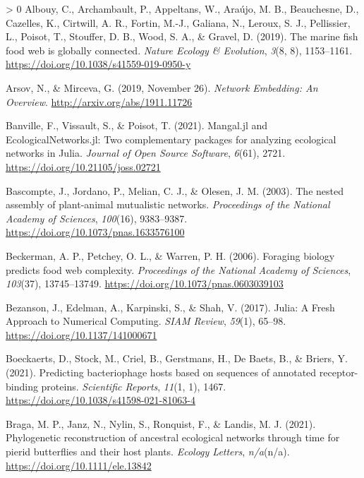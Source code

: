 \documentclass[10pt,oneside]{article}
\newlength{\cslhangindent}
\newenvironment{CSLReferences}[3] %
 {%
  \setlength{\parindent}{0pt}
  \ifodd #1 \everypar{\setlength{\hangindent}{\cslhangindent}}\ignorespaces\fi
  \ifnum #2 > 0
  \setlength{\parskip}{#2\baselineskip}
  \fi
 }%
 {}
\begin{document}
\hypertarget{refs}{}
\begin{CSLReferences}{1}{0}
\leavevmode\hypertarget{ref-Albouy2019MarFis}{}%
Albouy, C., Archambault, P., Appeltans, W., Araújo, M. B., Beauchesne,
D., Cazelles, K., Cirtwill, A. R., Fortin, M.-J., Galiana, N., Leroux,
S. J., Pellissier, L., Poisot, T., Stouffer, D. B., Wood, S. A., \&
Gravel, D. (2019). The marine fish food web is globally connected.
\emph{Nature Ecology \& Evolution}, \emph{3}(8, 8), 1153--1161.
\url{https://doi.org/10.1038/s41559-019-0950-y}

\leavevmode\hypertarget{ref-Arsov2019NetEmb}{}%
Arsov, N., \& Mirceva, G. (2019, November 26). \emph{Network Embedding:
An Overview}. \url{http://arxiv.org/abs/1911.11726}

\leavevmode\hypertarget{ref-Banville2021ManJl}{}%
Banville, F., Vissault, S., \& Poisot, T. (2021). Mangal.jl and
EcologicalNetworks.jl: Two complementary packages for analyzing
ecological networks in Julia. \emph{Journal of Open Source Software},
\emph{6}(61), 2721. \url{https://doi.org/10.21105/joss.02721}

\leavevmode\hypertarget{ref-Bascompte2003NesAss}{}%
Bascompte, J., Jordano, P., Melian, C. J., \& Olesen, J. M. (2003). The
nested assembly of plant-animal mutualistic networks. \emph{Proceedings
of the National Academy of Sciences}, \emph{100}(16), 9383--9387.
\url{https://doi.org/10.1073/pnas.1633576100}

\leavevmode\hypertarget{ref-Beckerman2006ForBio}{}%
Beckerman, A. P., Petchey, O. L., \& Warren, P. H. (2006). Foraging
biology predicts food web complexity. \emph{Proceedings of the National
Academy of Sciences}, \emph{103}(37), 13745--13749.
\url{https://doi.org/10.1073/pnas.0603039103}

\leavevmode\hypertarget{ref-Bezanson2017JulFre}{}%
Bezanson, J., Edelman, A., Karpinski, S., \& Shah, V. (2017). Julia: A
Fresh Approach to Numerical Computing. \emph{SIAM Review}, \emph{59}(1),
65--98. \url{https://doi.org/10.1137/141000671}

\leavevmode\hypertarget{ref-Boeckaerts2021PreBac}{}%
Boeckaerts, D., Stock, M., Criel, B., Gerstmans, H., De Baets, B., \&
Briers, Y. (2021). Predicting bacteriophage hosts based on sequences of
annotated receptor-binding proteins. \emph{Scientific Reports},
\emph{11}(1, 1), 1467. \url{https://doi.org/10.1038/s41598-021-81063-4}

\leavevmode\hypertarget{ref-Braga2021PhyRec}{}%
Braga, M. P., Janz, N., Nylin, S., Ronquist, F., \& Landis, M. J.
(2021). Phylogenetic reconstruction of ancestral ecological networks
through time for pierid butterflies and their host plants. \emph{Ecology
Letters}, \emph{n/a}(n/a). \url{https://doi.org/10.1111/ele.13842}


\end{CSLReferences}
\end{document}
